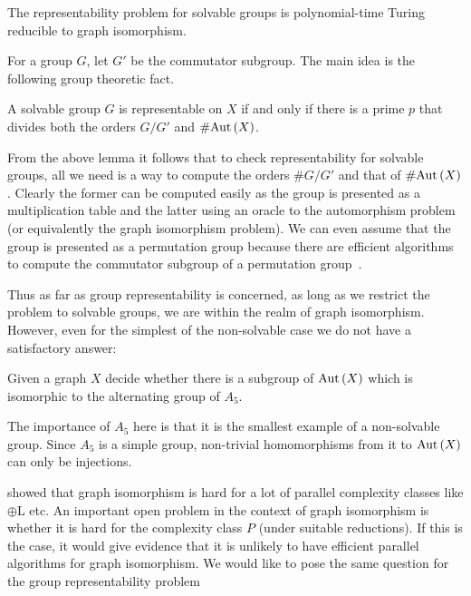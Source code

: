 \documentclass{article}
\begin{document}
\begin{lemma}
  The representability problem for solvable groups is polynomial-time
  Turing reducible to graph isomorphism.
\end{lemma}

For a group $G$, let $G'$ be the commutator subgroup. The main idea is
the following group theoretic fact.

\begin{lemma}
  A solvable group $G$ is representable on $X$ if and only if there is
  a prime $p$ that divides both the orders $G/G'$ and $\# \mathrm{Aut}\left(X\right)$.
\end{lemma}

From the above lemma it follows that to check representability for
solvable groups, all we need is a way to compute the orders $\# G/G'$
and that of $\# \mathrm{Aut}\left(X\right)$.  Clearly the former can be computed easily
as the group is presented as a multiplication table and the latter
using an oracle to the automorphism problem (or equivalently the graph
isomorphism problem).  We can even assume that the group is presented
as a permutation group because there are efficient algorithms to
compute the commutator subgroup of a permutation
group~\cite[Theorem~4]{furst80polynomialtime}.

Thus as far as group representability is concerned, as long as we
restrict the problem to solvable groups, we are within the realm of
graph isomorphism. However, even for the simplest of the non-solvable
case we do not have a satisfactory answer:

\begin{openproblem}
  Given a graph $X$ decide whether there is a subgroup of $\mathrm{Aut}\left(X\right)$
  which is isomorphic to the alternating group of $A_5$.
\end{openproblem}

The importance of $A_5$ here is that it is the smallest example of a
non-solvable group. Since $A_5$ is a simple group, non-trivial
homomorphisms from it to $\mathrm{Aut}\left(X\right)$ can only be injections.

\citet*{toran2004hardness} showed that graph isomorphism is hard for a
lot of parallel complexity classes like $\oplus \mathrm{L}$ etc.  An
important open problem in the context of graph isomorphism is whether
it is hard for the complexity class $P$ (under suitable
reductions). If this is the case, it would give evidence that it is
unlikely to have efficient parallel algorithms for graph isomorphism.
We would like to pose the same question for the group representability
problem
\end{document}
